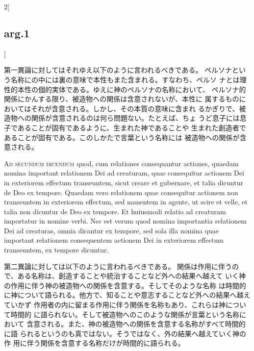 \documentclass[paper=a4paper,fontsize=10pt,jafontsize=9pt,titlepage]{jlreq}
\begin{document}
\begin{paracol}{2}[\subsection{arg.1}]
\switchcolumn

第一異論に対してはそれゆえ以下のように言われるべきである。
ペルソナという名称にの中には裏の意味で本性もまた含まれる。すなわち、ペルソ
 ナとは理性的本性の個的実体である。ゆえに神のペルソナの名称において、
 ペルソナ的関係にかんする限り、被造物への関係は含意されないが、本性に
 属するものにおいてはそれが含意される。しかし、その本質の意味に含まれ
 るかぎりで、被造物への関係が含意されるのは何ら問題ない。たとえば、ちょ
 うど息子には息子であることが固有であるように、生まれた神であることや
 生まれた創造者であることが固有である。このしかたで言葉という名称には
 被造物への関係が含意される。

\switchcolumn*[\subsection{ad.2}]

{\scshape Ad secundum dicendum} quod, cum relationes consequantur actiones,
quaedam nomina important relationem Dei ad creaturam, quae consequitur
actionem Dei in exteriorem effectum transeuntem, sicut creare et
gubernare, et talia dicuntur de Deo ex tempore. Quaedam vero
relationem quae consequitur actionem non transeuntem in exteriorem
effectum, sed manentem in agente, ut scire et velle, et talia non
dicuntur de Deo ex tempore. Et huiusmodi relatio ad creaturam
importatur in nomine verbi. Nec est verum quod nomina importantia
relationem Dei ad creaturas, omnia dicantur ex tempore, sed sola illa
nomina quae important relationem consequentem actionem Dei in
exteriorem effectum transeuntem, ex tempore dicuntur.

\switchcolumn

第二異論に対しては以下のように言われるべきである。
関係は作用に伴うので、ある名称は、創造することや統治することなど外への結果へ越えて
 いく神の作用に伴う神の被造物への関係を含意する。そしてそのような名称
 は時間的に神について語られる。他方で、知ることや意志することなど外への結果へ越えていかず
作用者の内に留まる作用に伴う関係を名称もあり、これらは神について時間的
 に語られない。そして被造物へのこのような関係が言葉という名称において
 含意される。また、神の被造物への関係を含意する名称がすべて時間的に語
 られるというのも真ではない。そうではなく、外の結果へ越えていく神の作
 用に伴う関係を含意する名称だけが時間的に語られる。

\switchcolumn*[\subsection{ad.3}]


\end{paracol}
\end{document}
